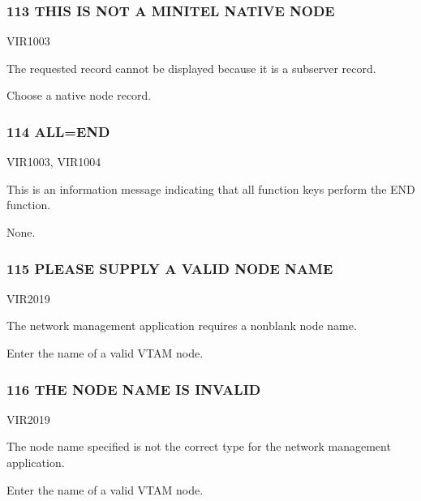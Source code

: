 \documentclass[letterpaper,10pt,english]{sphinxmanual}
\begin{document}
\subsubsection{113 THIS IS NOT A MINITEL NATIVE NODE}
\label{\detokenize{messages:this-is-not-a-minitel-native-node}}\begin{description}
\sphinxAtStartPar
VIR1003

\sphinxAtStartPar
The requested record cannot be displayed because it is a sub\sphinxhyphen{}server record.

\sphinxAtStartPar
Choose a native node record.

\end{description}


\subsubsection{114 ALL=END}
\label{\detokenize{messages:all-end}}\begin{description}
\sphinxAtStartPar
VIR1003, VIR1004

\sphinxAtStartPar
This is an information message indicating that all function keys perform the END function.

\sphinxAtStartPar
None.

\end{description}


\subsubsection{115 PLEASE SUPPLY A VALID NODE NAME}
\label{\detokenize{messages:please-supply-a-valid-node-name}}\begin{description}
\sphinxAtStartPar
VIR2019

\sphinxAtStartPar
The network management application requires a non\sphinxhyphen{}blank node name.

\sphinxAtStartPar
Enter the name of a valid VTAM node.

\end{description}


\subsubsection{116 THE NODE NAME IS INVALID}
\label{\detokenize{messages:the-node-name-is-invalid}}\begin{description}
\sphinxAtStartPar
VIR2019

\sphinxAtStartPar
The node name specified is not the correct type for the network management application.

\sphinxAtStartPar
Enter the name of a valid VTAM node.

\end{description}
\end{document}
